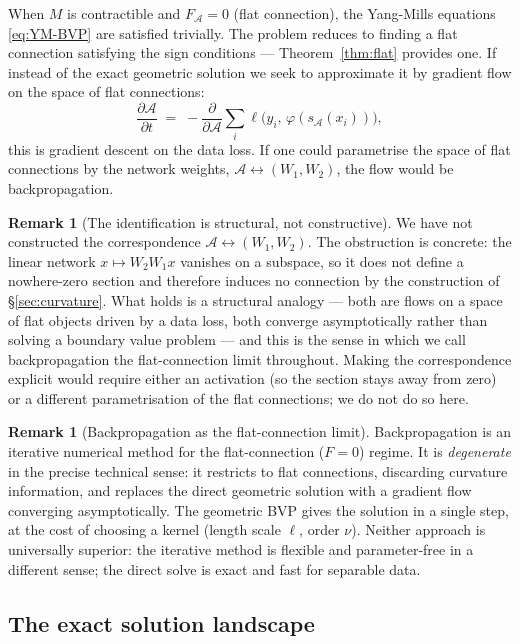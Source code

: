\documentclass[11pt, a4paper]{article}
\theoremstyle{plain}
\theoremstyle{definition}
\newtheorem{remark}[theorem]{Remark}
\newcommand{\Sig}{\mathcal{A}}
\begin{document}
When $M$ is contractible and $F_\Sig = 0$ (flat connection), the Yang-Mills
equations \eqref{eq:YM-BVP} are satisfied trivially. The problem reduces to
finding a flat connection satisfying the sign conditions --- Theorem~\ref{thm:flat}
provides one. If instead of the exact geometric solution we seek to approximate it
by gradient flow on the space of flat connections:
\[
  \frac{\partial\Sig}{\partial t} \;=\; -\frac{\partial}{\partial\Sig}
  \sum_i \ell\bigl(y_i,\,\varphi(s_\Sig(x_i))\bigr),
\]
this is gradient descent on the data loss. If one could parametrise the space of
flat connections by the network weights, $\Sig \leftrightarrow (W_1, W_2)$, the
flow would be backpropagation.

\begin{remark}[The identification is structural, not constructive]
\label{rem:backprop-gap}
We have not constructed the correspondence $\Sig \leftrightarrow (W_1,W_2)$.
The obstruction is concrete: the linear network $x \mapsto W_2W_1x$ vanishes on
a subspace, so it does not define a nowhere-zero section and therefore induces
no connection by the construction of \S\ref{sec:curvature}. What holds is a
structural analogy --- both are flows on a space of flat objects driven by a
data loss, both converge asymptotically rather than solving a boundary value
problem --- and this is the sense in which we call backpropagation the
flat-connection limit throughout. Making the correspondence explicit would
require either an activation (so the section stays away from zero) or a
different parametrisation of the flat connections; we do not do so here.
\end{remark}

\begin{remark}[Backpropagation as the flat-connection limit]
Backpropagation is an iterative numerical method for the flat-connection
($F=0$) regime. It is \emph{degenerate} in the precise technical sense: it
restricts to flat connections, discarding curvature information, and replaces
the direct geometric solution with a gradient flow converging asymptotically.
The geometric BVP gives the solution in a single step, at the cost of
choosing a kernel (length scale $\ell$, order $\nu$). Neither approach is
universally superior: the iterative method is flexible and parameter-free
in a different sense; the direct solve is exact and fast for separable data.
\end{remark}

\subsection{The exact solution landscape}
\end{document}
